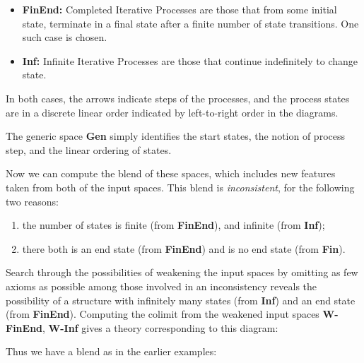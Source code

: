 
\begin{itemize}
\item  \textbf{FinEnd:} Completed Iterative Processes
are those that from some initial state, terminate in a final state
after a finite number of state transitions.  One such case is chosen.
\item 
\textbf{Inf:} Infinite Iterative Processes are those that continue indefinitely
to change state.
\end{itemize}
In both cases, the arrows indicate steps of the processes, and
the process states are in a discrete linear order indicated by left-to-right
order in the diagrams.

The generic space \textbf{Gen} simply identifies the start states, the
notion of process step, and the linear ordering of states.

Now we can compute the blend of these spaces,
which includes new features taken from both of the
input spaces.  This blend is \emph{inconsistent}, for the
following two reasons:
\begin{enumerate}
\item the number of states is finite (from \textbf{FinEnd}), and infinite
(from \textbf{Inf});
\item  there both is an end state (from \textbf{FinEnd})
and is no end state (from \textbf{Fin}).
\end{enumerate}
Search through the possibilities of weakening the input spaces by
omitting as few axioms as possible among those involved
in an inconsistency reveals the possibility of a structure
with infinitely many states (from \textbf{Inf}) and an
end state (from \textbf{FinEnd}).  Computing the
colimit from the weakened input spaces \textbf{W-FinEnd}, \textbf{W-Inf}
gives a theory corresponding to this diagram:
\begin{center}
\end{center}
Thus we have a blend as in the earlier examples:

